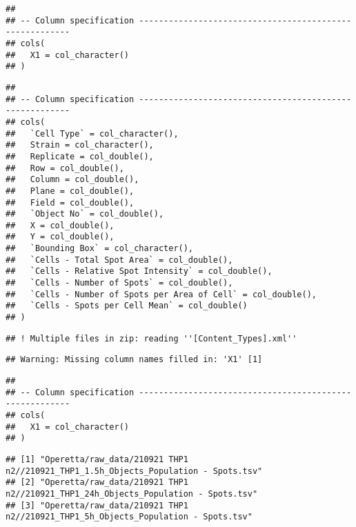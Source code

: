 \documentclass[
]{article}
\newenvironment{Shaded}{\begin{snugshade}}{\end{snugshade}}
\newcommand{\FunctionTok}[1]{\textcolor[rgb]{0.00,0.00,0.00}{#1}}
\newcommand{\NormalTok}[1]{#1}
\newcommand{\SpecialCharTok}[1]{\textcolor[rgb]{0.00,0.00,0.00}{#1}}
\begin{document}
\begin{verbatim}
## 
## -- Column specification --------------------------------------------------------
## cols(
##   X1 = col_character()
## )
\end{verbatim}

\begin{verbatim}
## 
## -- Column specification --------------------------------------------------------
## cols(
##   `Cell Type` = col_character(),
##   Strain = col_character(),
##   Replicate = col_double(),
##   Row = col_double(),
##   Column = col_double(),
##   Plane = col_double(),
##   Field = col_double(),
##   `Object No` = col_double(),
##   X = col_double(),
##   Y = col_double(),
##   `Bounding Box` = col_character(),
##   `Cells - Total Spot Area` = col_double(),
##   `Cells - Relative Spot Intensity` = col_double(),
##   `Cells - Number of Spots` = col_double(),
##   `Cells - Number of Spots per Area of Cell` = col_double(),
##   `Cells - Spots per Cell Mean` = col_double()
## )
\end{verbatim}

\begin{verbatim}
## ! Multiple files in zip: reading ''[Content_Types].xml''
\end{verbatim}

\begin{verbatim}
## Warning: Missing column names filled in: 'X1' [1]
\end{verbatim}

\begin{verbatim}
## 
## -- Column specification --------------------------------------------------------
## cols(
##   X1 = col_character()
## )
\end{verbatim}

\begin{Shaded}
\end{Shaded}

\begin{verbatim}
## [1] "Operetta/raw_data/210921 THP1 n2//210921_THP1_1.5h_Objects_Population - Spots.tsv"
## [2] "Operetta/raw_data/210921 THP1 n2//210921_THP1_24h_Objects_Population - Spots.tsv" 
## [3] "Operetta/raw_data/210921 THP1 n2//210921_THP1_5h_Objects_Population - Spots.tsv"
\end{verbatim}
\end{document}
